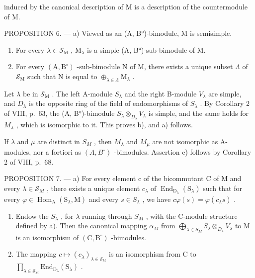 induced by the canonical description of M is a description of the countermodule of M.

PROPOSITION 6. --- a) Viewed as an (A, B°)-bimodule, M is semisimple.

\begin{enumerate}
\def\labelenumi{\alph{enumi})}
\setcounter{enumi}{1}
\item
  For every \(\lambda \in \mathcal{S}_{\mathrm{M}}\) , \(\mathrm{M}_{\lambda}\) is a simple (A, B°)-sub-bimodule of M.
\item
  For every \((\mathrm{A},\mathrm{B}^{\circ})\) -sub-bimodule N of M, there exists a unique subset \(\Lambda\) of \(\mathcal{S}_{\mathrm{M}}\) such that N is equal to \(\oplus_{\lambda \in \Lambda}\mathrm{M}_{\lambda}\) .
\end{enumerate}

Let \(\lambda\) be in \(\mathcal{S}_{\mathrm{M}}\) . The left A-module \(S_{\lambda}\) and the right B-module \(V_{\lambda}\) are simple, and \(D_{\lambda}\) is the opposite ring of the field of endomorphisms of \(S_{\lambda}\) . By Corollary 2 of VIII, p.~63, the (A, B°)-bimodule \(S_{\lambda} \otimes_{D_{\lambda}} V_{\lambda}\) is simple, and the same holds for \(M_{\lambda}\) , which is isomorphic to it. This proves b), and a) follows.

If \(\lambda\) and \(\mu\) are distinct in \(S_{M}\) , then \(M_{\lambda}\) and \(M_{\mu}\) are not isomorphic as A-modules, nor a fortiori as \((A,B^{\circ})\) -bimodules. Assertion c) follows by Corollary 2 of VIII, p.~68.

PROPOSITION 7. --- a) For every element c of the bicommutant C of M and every \(\lambda\in\mathcal{S}_{M}\) , there exists a unique element \(c_{\lambda}\) of \(\operatorname{End}_{\mathrm{D}_{\lambda}}(\mathrm{S}_{\lambda})\) such that for every \(\varphi\in\operatorname{Hom}_{\mathrm{A}}(\mathrm{S}_{\lambda},\mathrm{M})\) and every \(s\in S_{\lambda}\) , we have \(c\varphi(s)=\varphi(c_{\lambda}s)\) .

\begin{enumerate}
\def\labelenumi{\alph{enumi})}
\setcounter{enumi}{1}
\item
  Endow the \(S_{\lambda}\) , for \(\lambda\) running through \(S_{M}\) , with the C-module structure defined by a). Then the canonical mapping \(\alpha_{M}\) from \(\bigoplus_{\lambda\in S_{M}}S_{\lambda}\otimes_{D_{\lambda}}V_{\lambda}\) to M is an isomorphism of \((\mathrm{C},\mathrm{B}^{\circ})\) -bimodules.
\item
  The mapping \(c \mapsto (c_{\lambda})_{\lambda \in \mathcal{S}_{\mathrm{M}}}\) is an isomorphism from C to \(\prod_{\lambda \in \mathcal{S}_{\mathrm{M}}}\mathrm{End}_{\mathrm{D}_{\lambda}}(\mathrm{S}_{\lambda})\) .
\end{enumerate}

